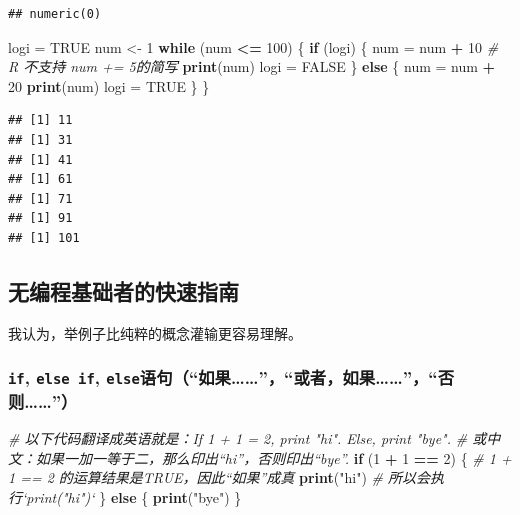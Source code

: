 \documentclass[]{book}
\newenvironment{Shaded}{\begin{snugshade}}{\end{snugshade}}
\newcommand{\CommentTok}[1]{\textcolor[rgb]{0.56,0.35,0.01}{\textit{#1}}}
\newcommand{\ControlFlowTok}[1]{\textcolor[rgb]{0.13,0.29,0.53}{\textbf{#1}}}
\newcommand{\DecValTok}[1]{\textcolor[rgb]{0.00,0.00,0.81}{#1}}
\newcommand{\KeywordTok}[1]{\textcolor[rgb]{0.13,0.29,0.53}{\textbf{#1}}}
\newcommand{\NormalTok}[1]{#1}
\newcommand{\OperatorTok}[1]{\textcolor[rgb]{0.81,0.36,0.00}{\textbf{#1}}}
\newcommand{\OtherTok}[1]{\textcolor[rgb]{0.56,0.35,0.01}{#1}}
\newcommand{\StringTok}[1]{\textcolor[rgb]{0.31,0.60,0.02}{#1}}
\begin{document}
\begin{verbatim}
## numeric(0)
\end{verbatim}

\begin{Shaded}
\begin{Highlighting}[]
\NormalTok{logi =}\StringTok{ }\OtherTok{TRUE}
\NormalTok{num <-}\StringTok{ }\DecValTok{1}
\ControlFlowTok{while}\NormalTok{ (num }\OperatorTok{<=}\StringTok{ }\DecValTok{100}\NormalTok{) \{}
  \ControlFlowTok{if}\NormalTok{ (logi) \{}
\NormalTok{    num =}\StringTok{ }\NormalTok{num }\OperatorTok{+}\StringTok{ }\DecValTok{10} \CommentTok{# R 不支持 num += 5的简写}
    \KeywordTok{print}\NormalTok{(num)}
\NormalTok{    logi =}\StringTok{ }\OtherTok{FALSE}
\NormalTok{  \} }\ControlFlowTok{else}\NormalTok{ \{}
\NormalTok{    num =}\StringTok{ }\NormalTok{num }\OperatorTok{+}\StringTok{ }\DecValTok{20}
    \KeywordTok{print}\NormalTok{(num)}
\NormalTok{    logi =}\StringTok{ }\OtherTok{TRUE}
\NormalTok{  \}}
\NormalTok{\}}
\end{Highlighting}
\end{Shaded}

\begin{verbatim}
## [1] 11
## [1] 31
## [1] 41
## [1] 61
## [1] 71
## [1] 91
## [1] 101
\end{verbatim}

\hypertarget{kickstart}{%
\subsection{无编程基础者的快速指南}\label{kickstart}}

我认为，举例子比纯粹的概念灌输更容易理解。

\hypertarget{if-else-if-else}{%
\subsubsection{\texorpdfstring{\texttt{if}, \texttt{else\ if}, \texttt{else}语句（``如果\ldots{}\ldots{}''，``或者，如果\ldots{}\ldots{}''，``否则\ldots{}\ldots{}''）}{if, else if, else语句（``如果\ldots{}\ldots{}''，``或者，如果\ldots{}\ldots{}''，``否则\ldots{}\ldots{}''）}}\label{if-else-if-else}}

\begin{Shaded}
\begin{Highlighting}[]
\CommentTok{# 以下代码翻译成英语就是：If 1 + 1 = 2, print "hi". Else, print "bye".}
\CommentTok{# 或中文：如果一加一等于二，那么印出“hi”，否则印出“bye”.}
\ControlFlowTok{if}\NormalTok{ (}\DecValTok{1} \OperatorTok{+}\StringTok{ }\DecValTok{1} \OperatorTok{==}\StringTok{ }\DecValTok{2}\NormalTok{) \{ }\CommentTok{# 1 + 1 == 2 的运算结果是TRUE，因此“如果”成真}
  \KeywordTok{print}\NormalTok{(}\StringTok{"hi"}\NormalTok{) }\CommentTok{# 所以会执行`print("hi")`}
\NormalTok{\} }\ControlFlowTok{else}\NormalTok{ \{}
  \KeywordTok{print}\NormalTok{(}\StringTok{"bye"}\NormalTok{)}
\NormalTok{\}}
\end{Highlighting}
\end{Shaded}
\end{document}
